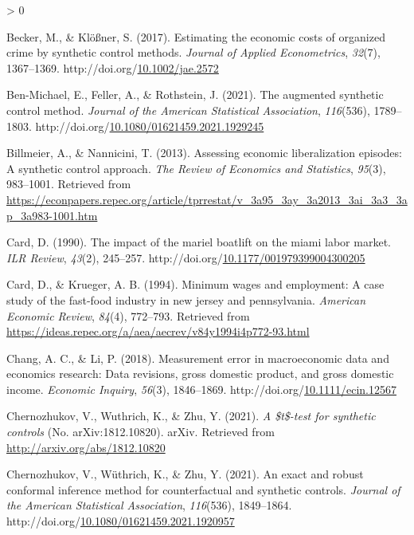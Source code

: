 \documentclass[12pt,nobind, a4paper]{reedthesis}
\newlength{\cslhangindent}
\newenvironment{CSLReferences}[2] %
{%
	\setlength{\parindent}{0pt}
	\ifodd #1 \everypar{\setlength{\hangindent}{\cslhangindent}}\ignorespaces\fi
	\ifnum #2 > 0
	\setlength{\parskip}{#2\baselineskip}
	\fi
}%
{}
\begin{document}
\begin{CSLReferences}{1}{0}
 \leavevmode\hypertarget{ref-becker_estimating_2017}{}%
 Becker, M., \& Klößner, S. (2017). Estimating the economic costs of organized crime by synthetic control methods. \emph{Journal of Applied Econometrics}, \emph{32}(7), 1367--1369. http://doi.org/\href{https://doi.org/10.1002/jae.2572}{10.1002/jae.2572}

 \leavevmode\hypertarget{ref-ben-michael_augmented_2021}{}%
 Ben-Michael, E., Feller, A., \& Rothstein, J. (2021). The augmented synthetic control method. \emph{Journal of the American Statistical Association}, \emph{116}(536), 1789--1803. http://doi.org/\href{https://doi.org/10.1080/01621459.2021.1929245}{10.1080/01621459.2021.1929245}

 \leavevmode\hypertarget{ref-billmeier_assessing_2013}{}%
 Billmeier, A., \& Nannicini, T. (2013). Assessing economic liberalization episodes: A synthetic control approach. \emph{The Review of Economics and Statistics}, \emph{95}(3), 983--1001. Retrieved from \url{https://econpapers.repec.org/article/tprrestat/v_3a95_3ay_3a2013_3ai_3a3_3ap_3a983-1001.htm}

 \leavevmode\hypertarget{ref-card_impact_1990}{}%
 Card, D. (1990). The impact of the mariel boatlift on the miami labor market. \emph{{ILR} Review}, \emph{43}(2), 245--257. http://doi.org/\href{https://doi.org/10.1177/001979399004300205}{10.1177/001979399004300205}

 \leavevmode\hypertarget{ref-card_minimum_1994}{}%
 Card, D., \& Krueger, A. B. (1994). Minimum wages and employment: A case study of the fast-food industry in new jersey and pennsylvania. \emph{American Economic Review}, \emph{84}(4), 772--793. Retrieved from \url{https://ideas.repec.org/a/aea/aecrev/v84y1994i4p772-93.html}

 \leavevmode\hypertarget{ref-chang_measurement_2018}{}%
 Chang, A. C., \& Li, P. (2018). Measurement error in macroeconomic data and economics research: Data revisions, gross domestic product, and gross domestic income. \emph{Economic Inquiry}, \emph{56}(3), 1846--1869. http://doi.org/\href{https://doi.org/10.1111/ecin.12567}{10.1111/ecin.12567}

 \leavevmode\hypertarget{ref-chernozhukov_t-test_2021}{}%
 Chernozhukov, V., Wuthrich, K., \& Zhu, Y. (2021). \emph{A \$t\$-test for synthetic controls} (No. {arXiv}:1812.10820). {arXiv}. Retrieved from \url{http://arxiv.org/abs/1812.10820}

 \leavevmode\hypertarget{ref-chernozhukov_exact_2021}{}%
 Chernozhukov, V., Wüthrich, K., \& Zhu, Y. (2021). An exact and robust conformal inference method for counterfactual and synthetic controls. \emph{Journal of the American Statistical Association}, \emph{116}(536), 1849--1864. http://doi.org/\href{https://doi.org/10.1080/01621459.2021.1920957}{10.1080/01621459.2021.1920957}


\end{CSLReferences}
\end{document}
